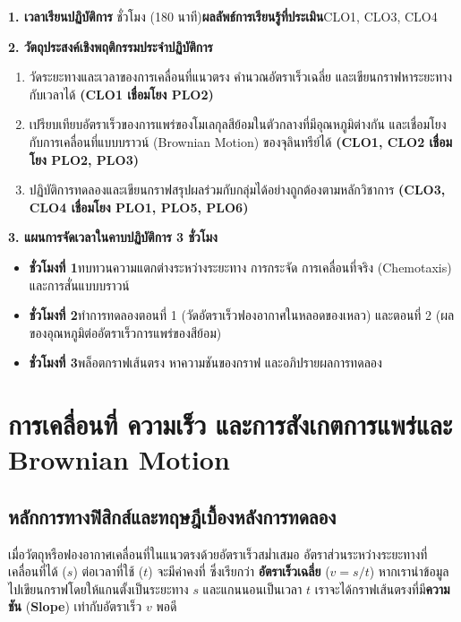\cleardoublepage
{}
\begin{planbox}
\noindent\textbf{1. เวลาเรียนปฏิบัติการ} ชั่วโมง (180 นาที)\quad \textbf{ผลลัพธ์การเรียนรู้ที่ประเมิน}\quad CLO1, CLO3, CLO4

\noindent\textbf{2. วัตถุประสงค์เชิงพฤติกรรมประจำปฏิบัติการ}
\begin{enumerate}
    \item วัดระยะทางและเวลาของการเคลื่อนที่แนวตรง คำนวณอัตราเร็วเฉลี่ย และเขียนกราฟหาระยะทางกับเวลาได้ \textbf{(CLO1 เชื่อมโยง PLO2)}
    \item เปรียบเทียบอัตราเร็วของการแพร่ของโมเลกุลสีย้อมในตัวกลางที่มีอุณหภูมิต่างกัน และเชื่อมโยงกับการเคลื่อนที่แบบบราวน์ (Brownian Motion) ของจุลินทรีย์ได้ \textbf{(CLO1, CLO2 เชื่อมโยง PLO2, PLO3)}
    \item ปฏิบัติการทดลองและเขียนกราฟสรุปผลร่วมกับกลุ่มได้อย่างถูกต้องตามหลักวิชาการ \textbf{(CLO3, CLO4 เชื่อมโยง PLO1, PLO5, PLO6)}
\end{enumerate}

\noindent\textbf{3. แผนการจัดเวลาในคาบปฏิบัติการ 3 ชั่วโมง}
\begin{itemize}
    \item \textbf{ชั่วโมงที่ 1}\quad ทบทวนความแตกต่างระหว่างระยะทาง การกระจัด การเคลื่อนที่จริง (Chemotaxis) และการสั่นแบบบราวน์
    \item \textbf{ชั่วโมงที่ 2}\quad ทำการทดลองตอนที่ 1 (วัดอัตราเร็วฟองอากาศในหลอดของเหลว) และตอนที่ 2 (ผลของอุณหภูมิต่ออัตราเร็วการแพร่ของสีย้อม)
    \item \textbf{ชั่วโมงที่ 3}\quad พล็อตกราฟเส้นตรง หาความชันของกราฟ และอภิปรายผลการทดลอง
\end{itemize}
\end{planbox}
\clearpage

\chapter{การเคลื่อนที่ ความเร็ว และการสังเกตการแพร่และ Brownian Motion}

\section{หลักการทางฟิสิกส์และทฤษฎีเบื้องหลังการทดลอง}

เมื่อวัตถุหรือฟองอากาศเคลื่อนที่ในแนวตรงด้วยอัตราเร็วสม่ำเสมอ อัตราส่วนระหว่างระยะทางที่เคลื่อนที่ได้ ($s$) ต่อเวลาที่ใช้ ($t$) จะมีค่าคงที่ ซึ่งเรียกว่า \textbf{อัตราเร็วเฉลี่ย} ($v = s/t$) หากเรานำข้อมูลไปเขียนกราฟโดยให้แกนตั้งเป็นระยะทาง $s$ และแกนนอนเป็นเวลา $t$ เราจะได้กราฟเส้นตรงที่มี\textbf{ความชัน} (\textbf{Slope}) เท่ากับอัตราเร็ว $v$ พอดี

